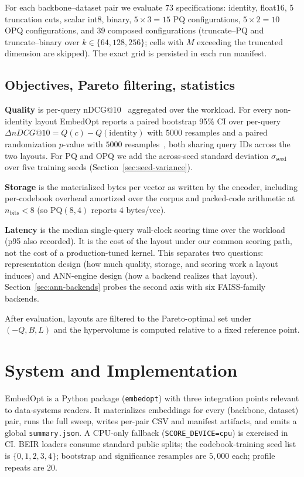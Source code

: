 \documentclass[sigconf]{acmart}
\makeatletter
\newcommand{\method}{EmbedOpt}
\newcommand{\ndcg}{nDCG@10}
\makeatother
\begin{document}
For each backbone--dataset pair we evaluate $73$ specifications: identity, float16, 5 truncation cuts, scalar int8, binary, $5\times 3 = 15$ PQ configurations, $5\times 2 = 10$ OPQ configurations, and 39 composed configurations (truncate--PQ and truncate--binary over $k \in \{64,128,256\}$; cells with $M$ exceeding the truncated dimension are skipped). The exact grid is persisted in each run manifest.

\subsection{Objectives, Pareto filtering, statistics}
\textbf{Quality} is per-query \ndcg{}~\cite{jarvelin2002cumulated} aggregated over the workload. For every non-identity layout \method{} reports a paired bootstrap 95\% CI over per-query $\Delta\ndcg = Q(c) - Q(\mathrm{identity})$ with $5000$ resamples and a paired randomization $p$-value with $5000$ resamples~\cite{smucker2007comparison}, both sharing query IDs across the two layouts. For PQ and OPQ we add the across-seed standard deviation $\sigma_{\text{seed}}$ over five training seeds (Section~\ref{sec:seed-variance}).

\textbf{Storage} is the materialized bytes per vector as written by the encoder, including per-codebook overhead amortized over the corpus and packed-code arithmetic at $n_{\text{bits}}<8$ (so PQ$(8, 4)$ reports $4$ bytes/vec).

\textbf{Latency} is the median single-query wall-clock scoring time over the workload (p95 also recorded). It is the cost of the layout under our common scoring path, not the cost of a production-tuned kernel. This separates two questions: representation design (how much quality, storage, and scoring work a layout induces) and ANN-engine design (how a backend realizes that layout). Section~\ref{sec:ann-backends} probes the second axis with six FAISS-family backends.

After evaluation, layouts are filtered to the Pareto-optimal set under $(-Q, B, L)$ and the hypervolume is computed relative to a fixed reference point.

\section{System and Implementation}
\label{sec:system}

\method{} is a Python package (\texttt{embedopt}) with three integration points relevant to data-systems readers. It materializes embeddings for every (backbone, dataset) pair, runs the full sweep, writes per-pair CSV and manifest artifacts, and emits a global \texttt{summary.json}. A CPU-only fallback (\texttt{SCORE\_DEVICE=cpu}) is exercised in CI. BEIR loaders consume standard public splits; the codebook-training seed list is $\{0,1,2,3,4\}$; bootstrap and significance resamples are $5{,}000$ each; profile repeats are $20$.
\end{document}

